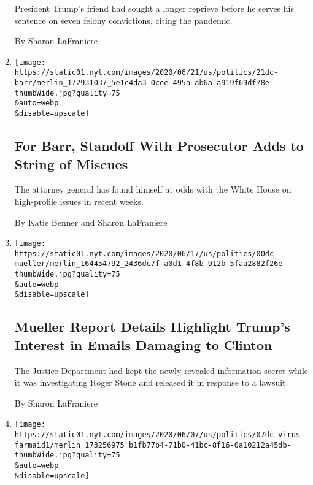 \begin{enumerate}
  President Trump's friend had sought a longer reprieve before he serves
  his sentence on seven felony convictions, citing the pandemic.

  By Sharon LaFraniere
\item
  \href{/2020/06/21/us/politics/barr-berman.html}{}

  \texttt{[image: https://static01.nyt.com/images/2020/06/21/us/politics/21dc-barr/merlin\_172931037\_5e1c4da3-0cee-495a-ab6a-a919f69df78e-thumbWide.jpg?quality=75\\\&auto=webp\\\&disable=upscale]}

  \hypertarget{for-barr-standoff-with-prosecutor-adds-to-string-of-miscues}{%
  \subsection{For Barr, Standoff With Prosecutor Adds to String of
  Miscues}\label{for-barr-standoff-with-prosecutor-adds-to-string-of-miscues}}

  The attorney general has found himself at odds with the White House on
  high-profile issues in recent weeks.

  By Katie Benner and Sharon LaFraniere
\item
  \href{/2020/06/19/us/politics/mueller-report-redactions-roger-stone.html}{}

  \texttt{[image: https://static01.nyt.com/images/2020/06/17/us/politics/00dc-mueller/merlin\_164454792\_2436dc7f-a0d1-4f8b-912b-5faa2882f26e-thumbWide.jpg?quality=75\\\&auto=webp\\\&disable=upscale]}

  \hypertarget{mueller-report-details-highlight-trumps-interest-in-emails-damaging-to-clinton}{%
  \subsection{Mueller Report Details Highlight Trump's Interest in
  Emails Damaging to
  Clinton}\label{mueller-report-details-highlight-trumps-interest-in-emails-damaging-to-clinton}}

  The Justice Department had kept the newly revealed information secret
  while it was investigating Roger Stone and released it in response to
  a lawsuit.

  By Sharon LaFraniere
\item
  \href{/2020/06/07/us/politics/virus-trump-aid-farmers.html}{}

  \texttt{[image: https://static01.nyt.com/images/2020/06/07/us/politics/07dc-virus-farmaid1/merlin\_173256975\_b1fb77b4-71b0-41bc-8f16-0a10212a45db-thumbWide.jpg?quality=75\\\&auto=webp\\\&disable=upscale]}


\end{enumerate}
